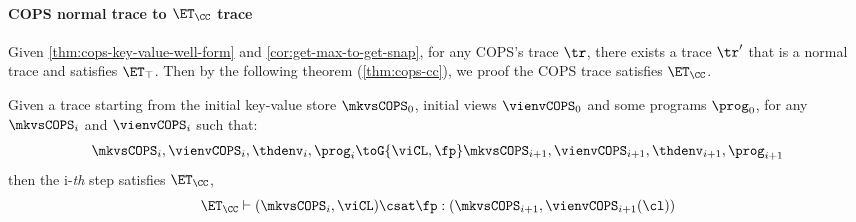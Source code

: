 \paragraph{\bf COPS normal trace to \( \ET_\CC \) trace}
Given \cref{thm:cops-key-value-well-form} and \cref{cor:get-max-to-get-snap}, for any COPS's trace \( \tr \), 
there exists a trace \( \tr' \) that is a normal trace and satisfies \( \ET_\top \).
Then by the following theorem (\cref{thm:cops-cc}), we proof the COPS trace satisfies \( \ET_\CC \).

\begin{theorem}
    \label{thm:cops-cc}
    Given a trace starting from the initial key-value store \( \mkvsCOPS_0 \), initial views \( \vienvCOPS_0 \) and some programs \( \prog_0 \), for any \( \mkvsCOPS_i \) and \( \vienvCOPS_i \)  such that: 
    \[
        \mkvsCOPS_i, \vienvCOPS_i, \thdenv_i, \prog_i \toG{\viCL,\fp} \mkvsCOPS_{i+1}, \vienvCOPS_{i+1}, \thdenv_{i+1}, \prog_{i+1} 
    \]
    then the i-\emph{th} step satisfies \( \ET_\CC \), \ie
    \[
        \ET_\CC \vdash ( \mkvsCOPS_i, \viCL ) \csat \fp : (\mkvsCOPS_{i+1},\vienvCOPS_{i+1}(\cl) )
    \]
\end{theorem}
